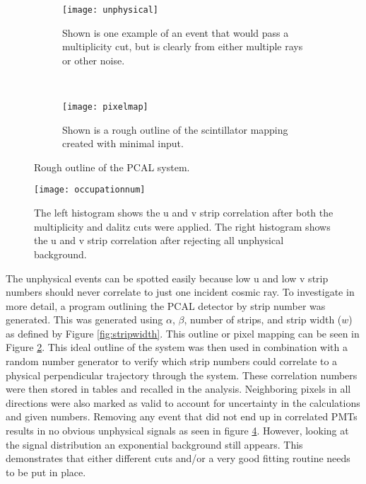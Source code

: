 \begin{figure}[h]
    \centering
    \begin{subfigure}[h]{0.44\textwidth}
        \centering
        \texttt{[image: unphysical]}
        \caption{Shown is one example of an event that would pass a multiplicity cut, but is clearly from either multiple rays or other noise.}
        \label{fig:unphysical}
    \end{subfigure}
    ~
    \begin{subfigure}[h]{0.44\textwidth}
        \centering
        \texttt{[image: pixelmap]}
        \caption{Shown is a rough outline of the scintillator mapping created with minimal input.}
        \label{fig:pixelmap}
    \end{subfigure}
    \caption{Rough outline of the PCAL system.}
    \label{fig:pixelexplain}
\end{figure}

\begin{figure}[h]
\centering
\texttt{[image: occupationnum]}
\caption{The left histogram shows the u and v strip correlation after both the multiplicity and dalitz cuts were applied. The right histogram shows the u and v strip correlation after rejecting all unphysical background.}
\label{fig:occupationnum}
\end{figure}


The unphysical events can be spotted easily because low u and low v strip numbers should never correlate to just one incident cosmic ray.
To investigate in more detail, a program outlining the PCAL detector by strip number was generated.
This was generated using $\alpha$, $\beta$, number of strips, and strip width ($w$) as defined by Figure \ref{fig:stripwidth}. This outline or pixel mapping can be seen in Figure \ref{fig:pixelmap}.
This ideal outline of the system was then used in combination with a random number generator to verify which strip numbers could correlate to a physical perpendicular trajectory through the system.
These correlation numbers were then stored in tables and recalled in the analysis. Neighboring pixels in all directions were also marked as valid to account for uncertainty in the calculations and given numbers. 
Removing any event that did not end up in correlated PMTs results in no obvious unphysical signals as seen in figure \ref{fig:occupationnum}. 
However, looking at the signal distribution an exponential background still appears. This demonstrates that either different cuts and/or a very good fitting routine needs to be put in place.



\FloatBarrier

